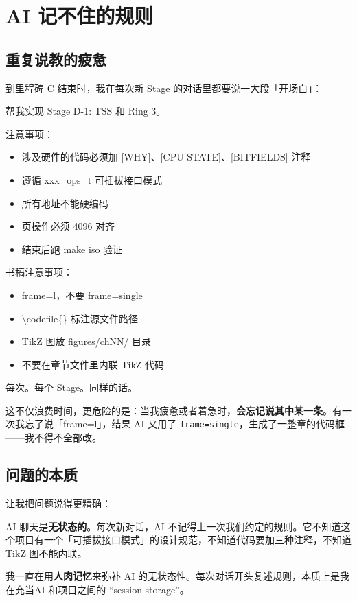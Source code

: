 \chapter{AI 记不住的规则}

\section{重复说教的疲惫}

到里程碑 C 结束时，我在每次新 Stage 的对话里都要说一大段「开场白」：

\begin{humanmsg}
帮我实现 Stage D-1: TSS 和 Ring 3。

注意事项：
\begin{itemize}
\item 涉及硬件的代码必须加 [WHY]、[CPU STATE]、[BITFIELDS] 注释
\item 遵循 xxx\_ops\_t 可插拔接口模式
\item 所有地址不能硬编码
\item 页操作必须 4096 对齐
\item 结束后跑 make iso 验证
\end{itemize}

书稿注意事项：
\begin{itemize}
\item frame=l，不要 frame=single
\item \textbackslash codefile\{\} 标注源文件路径
\item TikZ 图放 figures/chNN/ 目录
\item 不要在章节文件里内联 TikZ 代码
\end{itemize}
\end{humanmsg}

每次。每个 Stage。同样的话。

这不仅浪费时间，更危险的是：当我疲惫或者着急时，\textbf{会忘记说其中某一条}。有一次我忘了说「frame=l」，结果 AI 又用了 \texttt{frame=single}，生成了一整章的代码框——我不得不全部改。

\section{问题的本质}

让我把问题说得更精确：

AI 聊天是\textbf{无状态的}。每次新对话，AI 不记得上一次我们约定的规则。它不知道这个项目有一个「可插拔接口模式」的设计规范，不知道代码要加三种注释，不知道 TikZ 图不能内联。

我一直在用\textbf{人肉记忆}来弥补 AI 的无状态性。每次对话开头复述规则，本质上是我在充当AI 和项目之间的 ``session storage''。

